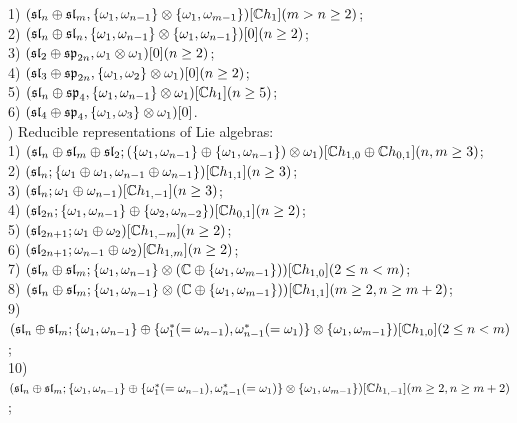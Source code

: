 \documentclass[12pt]{amsart}
\theoremstyle{definition}\newtheorem{theorem}{Theorem}[section]
\theoremstyle{definition}\newtheorem{definition}[proposition]{Definition}
\theoremstyle{remark}\newtheorem{example}[proposition]{Example}
\newcounter{AP}
\begin{document}
1) $(\frak {sl}_n\oplus\frak{sl}_m, \{\omega_1, \omega_{n-1}\}\otimes\{\omega_1, \omega_{m-1}\}) [\mathbb Ch_1](m>n\ge 2)$;\\2) $(\frak {sl}_n\oplus\frak{sl}_n, \{\omega_1, \omega_{n-1}\}\otimes\{\omega_1, \omega_{n-1}\}) [0](n\ge 2)$;\\3) $(\frak{sl}_2\oplus\frak{sp}_{2n}, \omega_1\otimes\omega_1) [0](n\ge 2)$;\\4)
$(\frak{sl}_3\oplus\frak{sp}_{2n}, \{\omega_1,\omega_2\}\otimes\omega_1) [0](n\ge 2)$;\\5) $(\frak{sl}_n\oplus\frak{sp}_4, \{\omega_1, \omega_{n-1}\}\otimes\omega_{1}) [\mathbb Ch_1](n\ge 5)$;\\6) $(\frak{sl}_4\oplus\frak{sp}_4, \{\omega_1, \omega_3\}\otimes\omega_{1}) [0]$.\\
\setcounter{AP}{3}) Reducible representations of Lie algebras:\\
1) $(\frak{sl}_n\oplus\frak{sl}_m\oplus\frak{sl}_2; (\{\omega_1, \omega_{n-1}\}\oplus\{\omega_1, \omega_{n-1}\})\otimes\omega_1) [\mathbb Ch_{1,0}\oplus\mathbb Ch_{0,1}](n, m\ge 3)$;\\
2) $(\frak{sl}_n; \{\omega_1\oplus\omega_1, \omega_{n-1}\oplus\omega_{n-1}\}) [\mathbb Ch_{1,1}](n\ge 3)$;\\
3) $(\frak{sl}_n; \omega_1\oplus\omega_{n-1}) [\mathbb Ch_{1,-1}](n\ge 3)$;\\
4) $(\frak{sl}_{2n}; \{\omega_1, \omega_{n-1}\}\oplus\{\omega_2, \omega_{n-2}\}) [\mathbb Ch_{0,1}](n\ge 2)$;\\
5) $(\frak{sl}_{2n+1}; \omega_1\oplus\omega_2) [\mathbb Ch_{1,-m}](n\ge 2)$;\\
6) $(\frak{sl}_{2n+1}; \omega_{n-1}\oplus\omega_2) [\mathbb Ch_{1, m}](n\ge 2)$;\\
7) $(\frak{sl}_n\oplus\frak{sl}_m; \{\omega_1, \omega_{n-1}\}\otimes(\mathbb C\oplus\{\omega_1, \omega_{m-1}\})) [\mathbb Ch_{1,0}](2\le n<m)$;\\
8) $(\frak{sl}_n\oplus\frak{sl}_m; \{\omega_1, \omega_{n-1}\}\otimes(\mathbb C\oplus\{\omega_1, \omega_{m-1}\})) [\mathbb Ch_{1, 1}](m\ge 2, n\ge m+2)$;\\
9) $(\frak{sl}_n\oplus\frak{sl}_m; \{\omega_1, \omega_{n-1}\}\oplus\{\omega_1^* (=\omega_{n-1}), \omega_{n-1}^* (=\omega_1)\}\otimes\{\omega_1, \omega_{m-1}\}) [\mathbb Ch_{1,0}](2\le n<m)$;\\
10) $(\frak{sl}_n\oplus\frak{sl}_m; \{\omega_1, \omega_{n-1}\}\oplus\{\omega_1^* (=\omega_{n-1}), \omega_{n-1}^* (=\omega_1)\}\otimes\{\omega_1, \omega_{m-1}\}) [\mathbb Ch_{1,-1}](m\ge 2, n\ge m+2)$;\\
\end{document}
